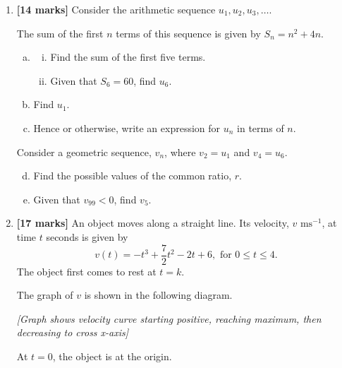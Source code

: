 \documentclass[12pt, twoside]{article}
\begin{document}
\begin{enumerate}
\vspace{1cm}

\item \textbf{[14 marks]} Consider the arithmetic sequence $u_1, u_2, u_3, \ldots$.

The sum of the first $n$ terms of this sequence is given by $S_n = n^2 + 4n$.

    \begin{enumerate}[(a)]
        \item \begin{enumerate}[(i)]
            \item Find the sum of the first five terms.
            \item Given that $S_6 = 60$, find $u_6$.
        \end{enumerate}
        \item Find $u_1$.
        \item Hence or otherwise, write an expression for $u_n$ in terms of $n$.
    \end{enumerate}
    
    Consider a geometric sequence, $v_n$, where $v_2 = u_1$ and $v_4 = u_6$.
    
    \begin{enumerate}[(a)]
        \setcounter{enumii}{3}
        \item Find the possible values of the common ratio, $r$.
        \item Given that $v_{99} < 0$, find $v_5$.
    \end{enumerate}

\vspace{1cm}

\item \textbf{[17 marks]} An object moves along a straight line. Its velocity, $v\text{ ms}^{-1}$, at time $t$ seconds is given by
\[
v(t) = -t^3 + \frac{7}{2}t^2 - 2t + 6, \text{ for } 0 \leq t \leq 4.
\]
The object first comes to rest at $t = k$.

The graph of $v$ is shown in the following diagram.

\begin{center}
\textit{[Graph shows velocity curve starting positive, reaching maximum, then decreasing to cross x-axis]}
\end{center}

At $t = 0$, the object is at the origin.


\end{enumerate}
\end{document}
